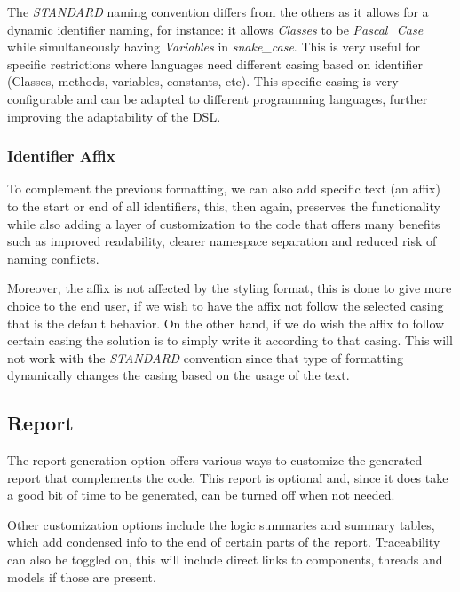 The \textit{STANDARD} naming convention differs from the others as it allows for a dynamic \gls{identifier} naming, for instance: it allows \textit{Classes} to be \textit{Pascal\_Case} while simultaneously having \textit{Variables} in \textit{snake\_case}. This is very useful for specific restrictions where languages need different casing based on \gls{identifier} (Classes, methods, variables, constants, etc). This specific casing is very configurable and can be adapted to different programming languages, further improving the adaptability of the \gls{DSL}.


\subsubsection{Identifier Affix}
\label{sec:dsl_name_affix}

To complement the previous formatting, we can also add specific text (an affix) to the start or end of all \glspl{identifier}, this, then again, preserves the functionality while also adding a layer of customization to the code that offers many benefits such as improved readability, clearer namespace separation and reduced risk of naming conflicts.

Moreover, the affix is not affected by the styling format, this is done to give more choice to the end user, if we wish to have the affix not follow the selected casing that is the default behavior. On the other hand, if we do wish the affix to follow certain casing the solution is to simply write it according to that casing. This will not work with the \textit{STANDARD} convention since that type of formatting dynamically changes the casing based on the usage of the text.


\subsection{Report}
\label{sec:dsl_report}

The report generation option offers various ways to customize the generated report that complements the code. This report is optional and, since it does take a good bit of time to be generated, can be turned off when not needed.

Other customization options include the logic summaries and summary tables, which add condensed info to the end of certain parts of the report. Traceability can also be toggled on, this will include direct links to components, threads and models if those are present.

